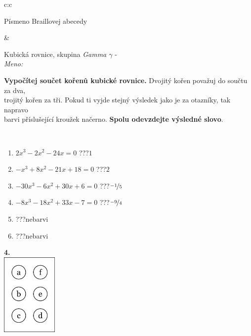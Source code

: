 \documentclass[10pt]{report}
\begin{document}
\begin{tabular}{c:c}
\begin{minipage}[c][104.5mm][t]{0.5\linewidth}
\begin{center}
\begin{minipage}{0.20\linewidth}
\begin{center}
{\small Písmeno Braillovej abecedy}
\end{center}
\end{minipage}
\end{center}
\end{minipage}
&
\begin{minipage}[c][104.5mm][t]{0.5\linewidth}
\begin{center}
\vspace{7mm}
{\huge Kubická rovnice, skupina \textit{Gamma $\gamma$} -}\\[5mm]
\textit{Meno:}\phantom{xxxxxxxxxxxxxxxxxxxxxxxxxxxxxxxxxxxxxxxxxxxxxxxxxxxxxxxxxxxxxxxxx}\\[5mm]
\begin{minipage}{0.95\linewidth}
\textbf{Vypočítej součet kořenů kubické rovnice.} Dvojitý kořen považuj do součtu za dva,\\trojitý kořen za tři. Pokud ti vyjde stejný výsledek jako je za otazníky, tak napravo\\barvi příslušející kroužek načerno. \textbf{Spolu odevzdejte výsledné slovo}.
\end{minipage}
\\[1mm]
\begin{minipage}{0.79\linewidth}
\begin{center}
\begin{varwidth}{\linewidth}
\begin{enumerate}
\Large
\item $2x^3-2x^2-24x=0$\quad \dotfill\; ???\;\dotfill \quad $1$
\item $-x^3+8x^2-21x+18=0$\quad \dotfill\; ???\;\dotfill \quad $2$
\item $-30x^3-6x^2+30x+6=0$\quad \dotfill\; ???\;\dotfill \quad $\nicefrac{-1}{5}$
\item $-8x^3-18x^2+33x-7=0$\quad \dotfill\; ???\;\dotfill \quad $\nicefrac{-9}{4}$
\item \quad \dotfill\; ???\;\dotfill \quad nebarvi
\item \quad \dotfill\; ???\;\dotfill \quad nebarvi
\end{enumerate}
\end{varwidth}
\end{center}
\end{minipage}
\begin{minipage}{0.20\linewidth}
\begin{center}
{\Huge\bfseries 4.} \\[2mm]
\includegraphics[height=40mm]{../images/braille.png}

\end{center}
\end{minipage}
\end{center}
\end{minipage}
\end{tabular}
\end{document}
